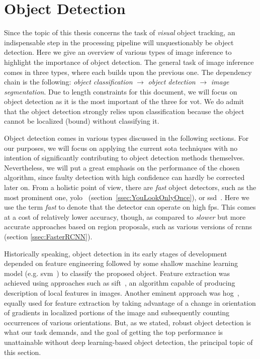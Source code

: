 \section{Object Detection}
\label{sec:ObjectDetection}

Since the topic of this thesis concerns the task of \emph{visual} object tracking, an indispensable step in the processing pipeline will unquestionably be object detection. Here we give an overview of various types of image inference to highlight the importance of object detection. The general task of image inference comes in three types, where each builds upon the previous one. The dependency chain is the following: \emph{object classification} $\to$ \emph{object detection} $\to$ \emph{image segmentation}. Due to length constraints for this document, we will focus on object detection as it is the most important of the three for \gls{vot}. We do admit that the object detection strongly relies upon classification because the object cannot be localized (bound) without classifying it.

Object detection comes in various types discussed in the following sections. For our purposes, we will focus on applying the current \gls{sota} techniques with no intention of significantly contributing to object detection methods themselves. Nevertheless, we will put a great emphasis on the performance of the chosen algorithm, since faulty detection with high confidence can hardly be corrected later on. From a holistic point of view, there are \emph{fast} object detectors, such as the most prominent one, \gls{yolo}~\cite{Redmon2016} (section~\ref{ssec:YouLookOnlyOnce}), or \gls{ssd}~\cite{Liu2016}. Here we use the term \emph{fast} to denote that the detector can operate on high \gls{fps}. This comes at a cost of relatively lower accuracy, though, as compared to \emph{slower} but more accurate approaches based on region proposals, such as various versions of \glspl{rcnn} (section \ref{ssec:FasterRCNN}).

Historically speaking, object detection in its early stages of development depended on feature engineering followed by some shallow machine learning model (e.g. \gls{svm}~\cite{cortes1995support}) to classify the proposed object. Feature extraction was achieved using approaches such as \gls{sift}~\cite{Lowe1999}, an algorithm capable of producing description of local features in images. Another eminent approach was \gls{hog}~\cite{osti_6007283}, equally used for feature extraction by taking advantage of a change in orientation of gradients in localized portions of the image and subsequently counting occurrences of various orientations. But, as we stated, robust object detection is what our task demands, and the goal of getting the top performance is unattainable without deep learning-based object detection, the principal topic of this section.

